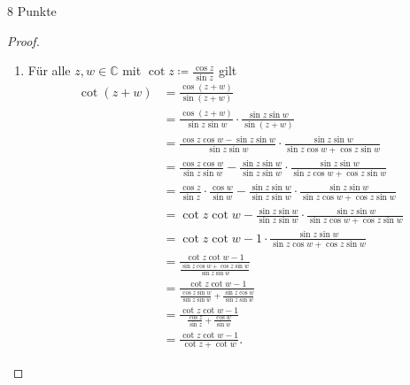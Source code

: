 \documentclass{problemset}
\begin{document}
\begin{problem}{8 Punkte}
\begin{proof}
    \begin{enumerate}
        \item Für alle $z, w \in \mathbb{C}$ mit $\cot z \coloneqq \frac{\cos
              z}{\sin z}$ gilt
              \begin{align*}
                  \cot (z + w) & = \frac{\cos (z + w)}{\sin (z + w)}                                                                                                                 \\
                               & = \frac{\cos (z + w)}{\sin z \sin w} \cdot \frac{\sin z \sin w}{\sin (z + w)}                                                                       \\
                               & = \frac{\cos z \cos w - \sin z \sin w}{\sin z \sin w} \cdot \frac{\sin z \sin w}{\sin z \cos w + \cos z \sin w}                                     \\
                               & = \frac{\cos z \cos w}{\sin z \sin w} - \frac{\sin z \sin w}{\sin z \sin w} \cdot \frac{\sin z \sin w}{\sin z \cos w + \cos z \sin w}               \\
                               & = \frac{\cos z}{\sin z} \cdot \frac{\cos w}{\sin w} - \frac{\sin z \sin w}{\sin z \sin w} \cdot \frac{\sin z \sin w}{\sin z \cos w + \cos z \sin w} \\
                               & = \cot z \cot w - \frac{\sin z \sin w}{\sin z \sin w} \cdot \frac{\sin z \sin w}{\sin z \cos w + \cos z \sin w}                                     \\
                               & = \cot z \cot w - 1 \cdot \frac{\sin z \sin w}{\sin z \cos w + \cos z \sin w}                                                                       \\
                               & = \frac{\cot z \cot w - 1}{\frac{\sin z \cos w + \cos z \sin w}{\sin z \sin w}}                                                                     \\
                               & = \frac{\cot z \cot w - 1}{\frac{\cos z \sin w}{\sin z \sin w} + \frac{\sin z \cos w}{\sin z \sin w}}                                               \\
                               & = \frac{\cot z \cot w - 1}{\frac{\cos z }{\sin z} + \frac{\cos w}{\sin w}}                                                                          \\
                               & = \frac{\cot z \cot w - 1}{\cot z + \cot w}.
              \end{align*}


\end{enumerate}
\end{proof}
\end{problem}
\end{document}
